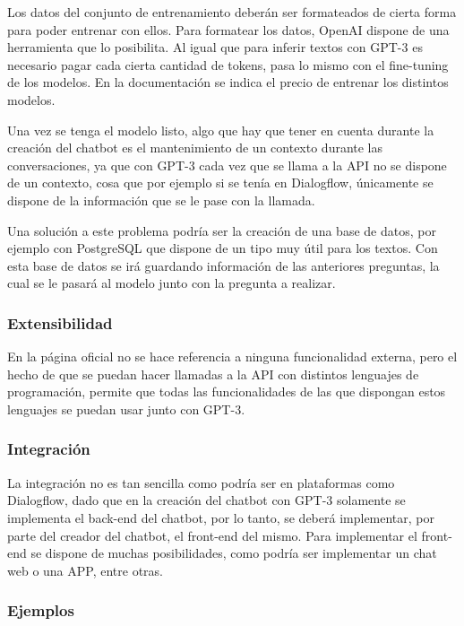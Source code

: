 Los datos del conjunto de entrenamiento deberán ser formateados de cierta forma para poder entrenar con ellos. Para formatear los datos, OpenAI dispone de una herramienta que lo posibilita. Al igual que para inferir textos con GPT-3 es necesario pagar cada cierta cantidad de tokens, pasa lo mismo con el fine-tuning de los modelos. En la documentación \cite{RefWorks:RefID:25-openai.} se indica el precio de entrenar los distintos modelos.

Una vez se tenga el modelo listo, algo que hay que tener en cuenta durante la creación del chatbot es el mantenimiento de un contexto durante las conversaciones, ya que con GPT-3 cada vez que se llama a la \gls{API} no se dispone de un contexto, cosa que por ejemplo si se tenía en Dialogflow, únicamente se dispone de la información que se le pase con la llamada.

Una solución a este problema podría ser la creación de una base de datos, por ejemplo con PostgreSQL que dispone de un tipo muy útil para los textos. Con esta base de datos se irá guardando información de las anteriores preguntas, la cual se le pasará al modelo junto con la pregunta a realizar.

\subsubsection*{Extensibilidad}

En la página oficial no se hace referencia a ninguna funcionalidad externa, pero el hecho de que se puedan hacer llamadas a la \gls{API} con distintos lenguajes de programación, permite que todas las funcionalidades de las que dispongan estos lenguajes se puedan usar junto con GPT-3.

\subsubsection*{Integración}

La integración no es tan sencilla como podría ser en plataformas como Dialogflow, dado que en la creación del chatbot con GPT-3 solamente se implementa el \gls{back-end} del chatbot, por lo tanto, se deberá implementar, por parte del creador del chatbot, el \gls{front-end} del mismo. Para implementar el \gls{front-end} se dispone de muchas posibilidades, como podría ser implementar un chat web o una APP, entre otras.

\subsubsection*{Ejemplos}

